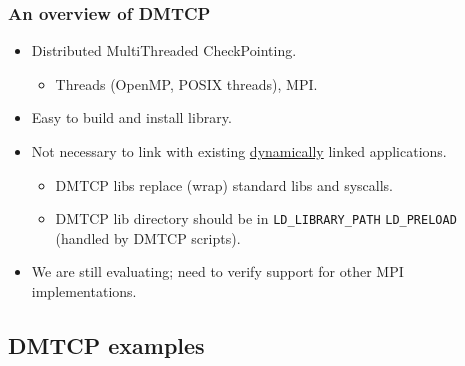 \documentclass[compress]{beamer}
\begin{document}

\begin{frame}
\frametitle{An overview of DMTCP}

\begin{itemize}
\item Distributed MultiThreaded CheckPointing.
  \begin{itemize}
  \item Threads (OpenMP, POSIX threads), MPI.
  \end{itemize}
\item Easy to build and install library.
\item Not necessary to link with existing \ul{dynamically} linked
applications.
  \begin{itemize}
  \item DMTCP libs replace (wrap) standard libs and syscalls.
  \item DMTCP lib directory should be in \texttt{LD\_LIBRARY\_PATH} 
	\texttt{LD\_PRELOAD} (handled by DMTCP scripts).
  \end{itemize}
\item We are still evaluating; need to verify support for other MPI
implementations.
\end{itemize}



\end{frame}






\subsection{DMTCP examples}   %

\end{document}
